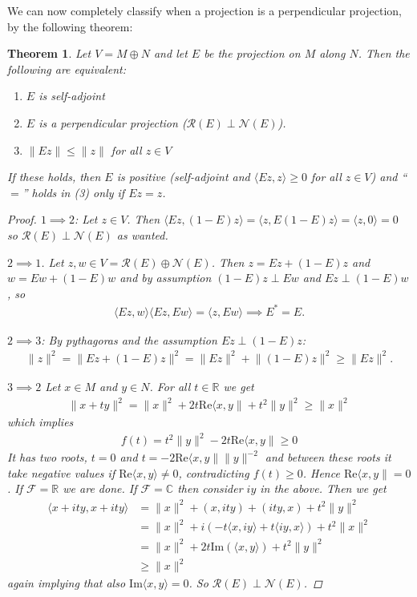 \documentclass[10pt,twoside,openany,final]{memoir}
\theoremstyle{break}
\newtheorem{theorem}[section]{Theorem}
\theoremstyle{Break}
\newcommand{\lv}{\lVert}
\newcommand{\rv}{\rVert}
\newcommand{\R}{\mathbb{R}}
\newcommand{\C}{\mathbb{C}}
\newcommand{\F}{\mathcal{F}}
\newcommand{\Rg}{\mathcal{R}}
\newcommand{\Nl}{\mathcal{N}}
\begin{document}
We can now completely classify when a projection is a perpendicular projection, by the following theorem:
\begin{theorem}
	Let $V=M \oplus N$ and let $E$ be the projection on $M$ along $N$. Then the following are equivalent:
	\begin{enumerate}
		\item $E$ is self-adjoint
		\item $E$ is a perpendicular projection ($\Rg(E)\perp \Nl(E)$).
		\item $\lv Ez \rv \leq \lv z \rv$ for all $z \in V$
	\end{enumerate}
	If these holds, then $E$ is positive (self-adjoint and $\langle Ez,z\rangle \geq 0$ for all $z \in V$) and “$=$” holds in (3) only if $Ez=z$.
	\begin{proof}
		$1 \implies 2$: Let $z \in V$. Then $\langle Ez, (1-E)z \rangle = \langle z,E(1-E)z\rangle=\langle z,0 \rangle=0$ so $\Rg(E) \perp \Nl(E)$ as wanted.

		$2 \implies 1$. Let $z, w \in V=\Rg(E) \oplus \Nl(E)$. Then $z=Ez+(1-E)z$ and $w = Ew + (1-E)w$ and by assumption $(1-E)z \perp Ew$ and $Ez \perp (1-E)w$, so
		\begin{align*}
			\langle Ez,w \rangle  \langle Ez,Ew\rangle =\langle z, Ew \rangle \implies E^*=E.
		\end{align*}
		
		$2 \implies 3$: By pythagoras and the assumption $Ez\perp (1-E)z$:
		\begin{align*}
			\lv z \rv ^2 = \lv Ez+(1-E)z\rv^2 =  \lv Ez \rv^2 + \lv (1-E)z \rv ^2 \geq \lv Ez\rv^2.
		\end{align*}

		$3 \implies 2$ Let $x \in M$ and $y \in N$. For all $t \in \R$ we get
		\begin{align*}
			\lv x+ty \rv^2 = \lv x \rv^2 + 2 t \textrm{Re}\langle x,y \rv + t^2 \lv y \rv^2 \geq \lv x \rv ^2
		\end{align*}
		which implies
		\begin{align*}
			f(t)=t^2 \lv y \rv ^2 - 2 t  \textrm{Re}\langle x,y \rv \geq 0
		\end{align*}
		It has two roots, $t=0$ and $t= - 2 \textrm{Re}\langle x,y \rv \lv y \rv^{-2}$ and between these roots it take negative values if $\textrm{Re}\langle x,y \rangle \neq 0$, contradicting $f(t) \geq 0$. Hence $\textrm{Re}\langle x,y \rv =0$. If $\F = \R$ we are done. If $\F= \C$ then consider $iy$ in the above. Then we get
		\begin{align*}
			\langle x+ity , x + ity \rangle &= \lv x  \rv ^2 + (x,ity)+ (ity,x)+t^2 \lv y \rv^2 \\
			&= \lv x \rv ^2 +i(-t\langle x , iy \rangle + t \langle iy,x \rangle ) +t^2 \lv x \rv ^2 \\
			&= \lv x \rv^2 + 2 t\textrm{Im} (\langle x, y \rangle ) + t^2 \lv y \rv ^2 \\
			&\geq \lv x\rv^2 		
		\end{align*}
		again implying that also $\textrm{Im}\langle x,y \rangle=0$. So $\Rg(E) \perp \Nl(E)$.
	\end{proof}
\end{theorem}
\end{document}
